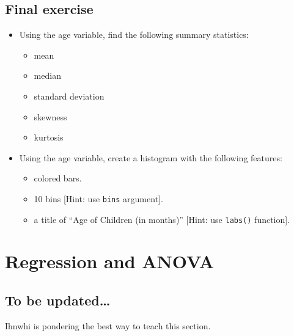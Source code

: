 \documentclass[
]{book}
\providecommand{\tightlist}{%
  \setlength{\itemsep}{0pt}\setlength{\parskip}{0pt}}
\begin{document}
\section{Final exercise}\label{final-exercise-2}

\begin{itemize}
\item
  Using the age variable, find the following summary statistics:

  \begin{itemize}
  \tightlist
  \item
    mean
  \item
    median
  \item
    standard deviation
  \item
    skewness
  \item
    kurtosis
  \end{itemize}
\item
  Using the age variable, create a histogram with the following features:

  \begin{itemize}
  \tightlist
  \item
    colored bars.
  \item
    10 bins {[}Hint: use \texttt{bins} argument{]}.
  \item
    a title of ``Age of Children (in months)'' {[}Hint: use \texttt{labs()} function{]}.
  \end{itemize}
\end{itemize}

\chapter{Regression and ANOVA}\label{regression-and-anova}

\section{To be updated\ldots{}}\label{to-be-updated}

Ihnwhi is pondering the best way to teach this section.

  
\end{document}

